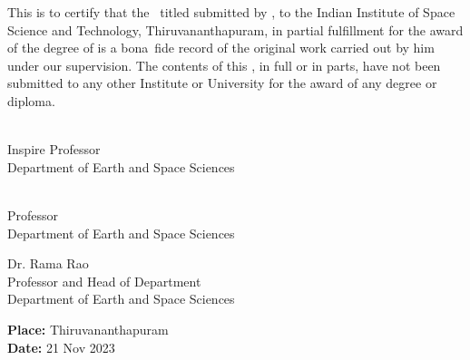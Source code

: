 \begin{ThesisCertificate}

\noindent This is to certify that the \Doctype\ titled \textbf{\textit{\Title}}
submitted by {\bf\Author}, to the Indian Institute of Space Science and
Technology, Thiruvananthapuram, in partial fulfillment for the award of the degree of {\bf\Degreetext} is a bona~fide record of the original work carried
out by him under our supervision. The contents of this \Doctype, in full or in parts, have not been submitted to any other Institute or University for the award of any degree or diploma.

\vspace{35mm}
\noindent
\begin{minipage}{0.5\textwidth}
\begin{flushleft}
\vspace*{-5mm}
\FirstAdvisor \\
Inspire Professor \\
Department of Earth and Space Sciences

\vspace{35mm}


\SecondAdvisor \\
Professor \\
Department of Earth and Space Sciences


\end{flushleft}
\end{minipage}
\hspace{2cm}
\begin{minipage}{0.5\textwidth}
\vspace{-60mm}
\begin{flushleft}
Dr. Rama Rao \\
Professor and Head of Department \\
Department of Earth and Space Sciences
\end{flushleft}
\end{minipage}



\vspace{28mm}
\noindent
\textbf{Place: }Thiruvananthapuram\\
\textbf{Date: }21 Nov 2023

\end{ThesisCertificate}
